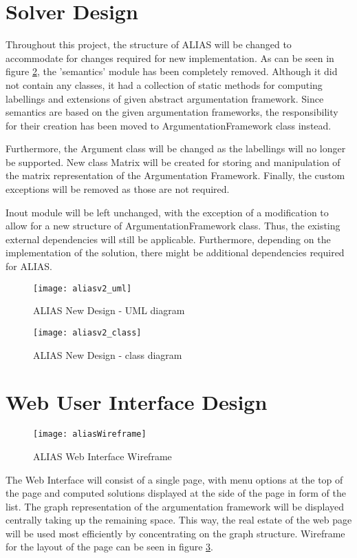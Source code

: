 \section{Solver Design}
Throughout this project, the structure of ALIAS will be changed to accommodate for changes required for new implementation. As can be seen in figure \ref{fig:aliasUml2}, the 'semantics' module has been completely removed. Although it did not contain any classes, it had a collection of static methods for computing labellings and extensions of given abstract argumentation framework. Since semantics are based on the given argumentation frameworks, the responsibility for their creation has been moved to ArgumentationFramework class instead. 

Furthermore, the Argument class will be changed as the labellings will no longer be supported. New class Matrix will be created for storing and manipulation of the matrix representation of the Argumentation Framework. Finally, the custom exceptions will be removed as those are not required.

Inout module will be left unchanged, with the exception of a modification to allow for a new structure of ArgumentationFramework class. Thus, the existing external dependencies will still be applicable. Furthermore, depending on the implementation of the solution, there might be additional dependencies required for ALIAS.

\begin{figure}[h]
	\texttt{[image: aliasv2\_uml]}
	\caption{ALIAS New Design - UML diagram}
	\label{fig:aliasUml2}
\end{figure}

\begin{figure}[h]
	\texttt{[image: aliasv2\_class]}
	\caption{ALIAS New Design - class diagram}
	\label{fig:aliasUml2}
\end{figure}

\section{Web User Interface Design}
\begin{figure}[h]
	\texttt{[image: aliasWireframe]}
	\caption{ALIAS Web Interface Wireframe}
	\label{fig:aliasWireframe}
\end{figure}
The Web Interface will consist of a single page, with menu options at the top of the page and computed solutions displayed at the side of the page in form of the list. The graph representation of the argumentation framework will be displayed centrally taking up the remaining space. This way, the real estate of the web page will be used most efficiently by concentrating on the graph structure. Wireframe for the layout of the page can be seen in figure \ref{fig:aliasWireframe}.



